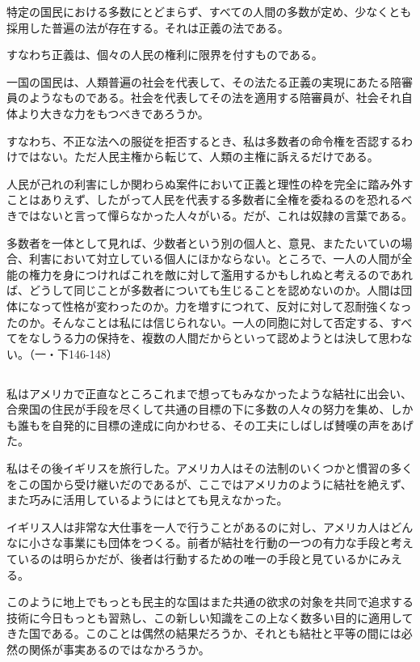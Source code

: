 特定の国民における多数にとどまらず、すべての人間の多数が定め、少なくとも採用した普遍の法が存在する。それは正義の法である。

すなわち正義は、個々の人民の権利に限界を付すものである。

一国の国民は、人類普遍の社会を代表して、その法たる正義の実現にあたる陪審員のようなものである。社会を代表してその法を適用する陪審員が、社会それ自体より大きな力をもつべきであろうか。

すなわち、不正な法への服従を拒否するとき、私は多数者の命令権を否認するわけではない。ただ人民主権から転じて、人類の主権に訴えるだけである。

人民が己れの利害にしか関わらぬ案件において正義と理性の枠を完全に踏み外すことはありえず、したがって人民を代表する多数者に全権を委ねるのを恐れるべきではないと言って憚らなかった人々がいる。だが、これは奴隷の言葉である。

多数者を一体として見れば、少数者という別の個人と、意見、またたいていの場合、利害において対立している個人にほかならない。ところで、一人の人間が全能の権力を身につければこれを敵に対して濫用するかもしれぬと考えるのであれば、どうして同じことが多数者についても生じることを認めないのか。人間は団体になって性格が変わったのか。力を増すにつれて、反対に対して忍耐強くなったのか。そんなことは私には信じられない。一人の同胞に対して否定する、すべてをなしうる力の保持を、複数の人間だからといって認めようとは決して思わない。（一・下146-148）

\subsection{}


私はアメリカで正直なところこれまで想ってもみなかったような結社に出会い、合衆国の住民が手段を尽くして共通の目標の下に多数の人々の努力を集め、しかも誰もを自発的に目標の達成に向かわせる、その工夫にしばしば賛嘆の声をあげた。

私はその後イギリスを旅行した。アメリカ人はその法制のいくつかと慣習の多くをこの国から受け継いだのであるが、ここではアメリカのように結社を絶えず、また巧みに活用しているようにはとても見えなかった。

イギリス人は非常な大仕事を一人で行うことがあるのに対し、アメリカ人はどんなに小さな事業にも団体をつくる。前者が結社を行動の一つの有力な手段と考えているのは明らかだが、後者は行動するための唯一の手段と見ているかにみえる。

このように地上でもっとも民主的な国はまた共通の欲求の対象を共同で追求する技術に今日もっとも習熟し、この新しい知識をこの上なく数多い目的に適用してきた国である。このことは偶然の結果だろうか、それとも結社と平等の間には必然の関係が事実あるのではなかろうか。

